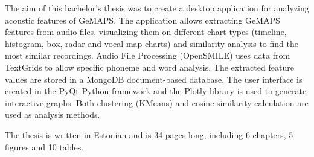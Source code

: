 The aim of this bachelor's thesis was to create a desktop application for analyzing acoustic features of GeMAPS. The application allows extracting GeMAPS features from audio files, visualizing them on different chart types (timeline, histogram, box, radar and vocal map charts) and similarity analysis to find the most similar recordings. Audio File Processing (OpenSMILE) uses data from TextGrids to allow specific phoneme and word analysis. The extracted feature values are stored in a MongoDB document-based database. The user interface is created in the PyQt Python framework and the Plotly library is used to generate interactive graphs. Both clustering (KMeans) and cosine similarity calculation are used as analysis methods.

The thesis is written in Estonian and is 34 pages long, including 6 chapters, 5 figures and 10 tables.